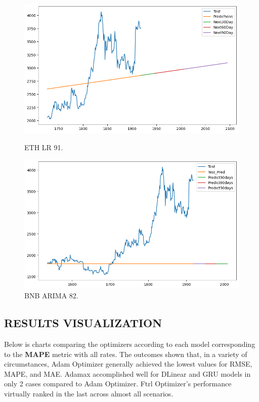 \documentclass{ieeeojies}
\begin{document}
\begin{figure}[H]
  \centering
  \begin{minipage}{0.48\linewidth}
    \centering
    \includegraphics[width=1\linewidth]{image/ETH_LR_91.png}
    \caption{ETH LR 91.}
  \end{minipage}
    \hfill
  \begin{minipage}{0.48\linewidth}
    \centering
    \includegraphics[width=1\linewidth]{image/ETH_ARIMA_82.png}
    \caption{BNB ARIMA 82.}
  \end{minipage}
\end{figure}

\subsection{RESULTS VISUALIZATION}
Below is charts comparing the optimizers according to each model corresponding to the \textbf{MAPE} metric with all rates. The outcomes shown that, in a variety of circumstances, Adam Optimizer generally achieved the lowest values for RMSE, MAPE, and MAE. Adamax accomplished well for DLinear and GRU models in only 2 cases compared to Adam Optimizer. Ftrl Optimizer's performance virtually ranked in the last across almost all scenarios.
\end{document}
